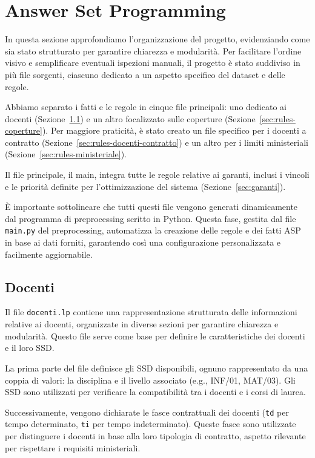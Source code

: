 \section{Answer Set Programming}\label{sec:asp}

In questa sezione approfondiamo l'organizzazione del progetto, evidenziando 
come sia stato strutturato per garantire chiarezza e modularità. 
Per facilitare l'ordine visivo e semplificare eventuali ispezioni manuali, 
il progetto è stato suddiviso in più file sorgenti, ciascuno dedicato a un 
aspetto specifico del dataset e delle regole.

Abbiamo separato i fatti e le regole in cinque file principali: uno dedicato 
ai docenti (Sezione~\ref{sec:rules-docenti}) e un altro focalizzato sulle 
coperture (Sezione~\ref{sec:rules-coperture}). Per maggiore praticità, è 
stato creato un file specifico per i docenti a contratto 
(Sezione~\ref{sec:rules-docenti-contratto}) e un altro per i limiti 
ministeriali (Sezione~\ref{sec:rules-ministeriale}).

Il file principale, il main, integra tutte le regole relative ai garanti, 
inclusi i vincoli e le priorità definite per l'ottimizzazione del sistema 
(Sezione~\ref{sec:garanti}).

È importante sottolineare che tutti questi file vengono generati dinamicamente 
dal programma di preprocessing scritto in Python. Questa fase, gestita dal 
file \texttt{main.py} del preprocessing, automatizza la creazione delle regole 
e dei fatti ASP in base ai dati forniti, garantendo così una configurazione 
personalizzata e facilmente aggiornabile. 


\subsection{Docenti}\label{sec:rules-docenti}
Il file \texttt{docenti.lp} contiene una rappresentazione strutturata delle 
informazioni relative ai docenti, organizzate in diverse sezioni per garantire 
chiarezza e modularità. Questo file serve come base per definire le caratteristiche 
dei docenti e il loro SSD.

La prima parte del file definisce gli SSD disponibili, ognuno rappresentato da una 
coppia di valori: la disciplina e il livello associato (e.g., INF/01, MAT/03). Gli SSD 
sono utilizzati per verificare la compatibilità tra i docenti e i corsi di laurea.

Successivamente, vengono dichiarate le fasce contrattuali dei docenti (\texttt{td} 
per tempo determinato, \texttt{ti} per tempo indeterminato). Queste fasce sono 
utilizzate per distinguere i docenti in base alla loro tipologia di contratto,
aspetto rilevante per rispettare i requisiti ministeriali.

